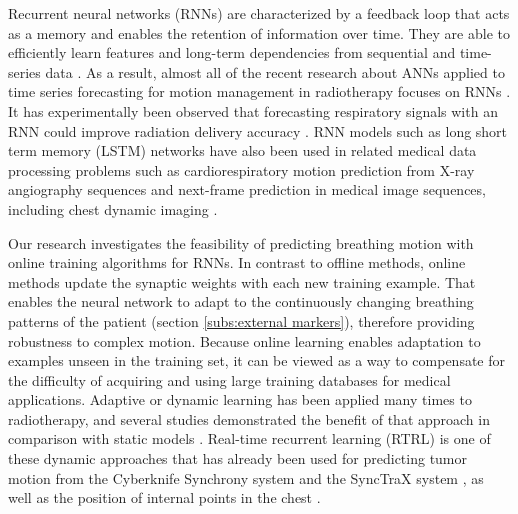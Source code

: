 \documentclass[twocolumn,a4paper]{svjour3} \sloppy          \smartqed
\begin{document}

Recurrent neural networks (RNNs) are characterized by a feedback loop that acts as a memory and enables the retention of information over time. They are able to efficiently learn features and long-term dependencies from sequential and time-series data \cite{salehinejad2017recent}. As a result, almost all of the recent research about ANNs applied to time series forecasting for motion management in radiotherapy focuses on RNNs \cite{kai2018prediction, wang2018feasibility, yun2019deep, lin2019towards, mafi2020real, yu2020rapid, lee2021geometric, wang2021real, POHL2021101941}. It has experimentally been observed that forecasting respiratory signals with an RNN could improve radiation delivery accuracy \cite{lee2021geometric}. RNN models such as long short term memory (LSTM) networks have also been used in related medical data processing problems such as cardiorespiratory motion prediction from X-ray angiography sequences \cite{azizmohammadi2019model} and next-frame prediction in medical image sequences, including chest dynamic imaging \cite{nabavi2020respiratory, romaguera2020prediction}.

Our research investigates the feasibility of predicting breathing motion with online training algorithms for RNNs. In contrast to offline methods, online methods update the synaptic weights with each new training example. That enables the neural network to adapt to the continuously changing breathing patterns of the patient (section \ref{subs:external markers}), therefore providing robustness to complex motion. Because online learning enables adaptation to examples unseen in the training set, it can be viewed as a way to compensate for the difficulty of acquiring and using large training databases for medical applications. Adaptive or dynamic learning has been applied many times to radiotherapy, and several studies demonstrated the benefit of that approach in comparison with static models \cite{krauss2011comparative, teo2018feasibility, mafi2020real}. Real-time recurrent learning (RTRL) \cite{williams1989learning} is one of these dynamic approaches that has already been used for predicting tumor motion from the Cyberknife Synchrony system \cite{mafi2020real} and the SyncTraX system \cite{jiang2019prediction}, as well as the position of internal points in the chest \cite{POHL2021101941}.
\end{document}
